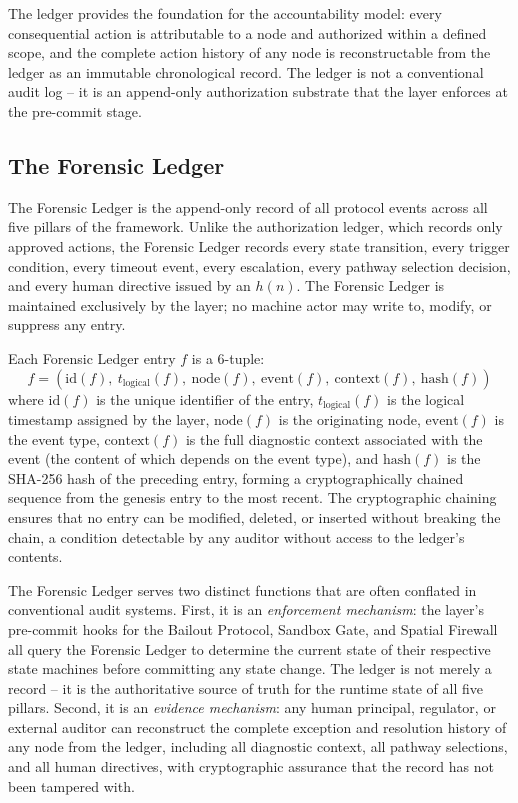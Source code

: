 The ledger provides the foundation for the \bxthree{} accountability model:
every consequential action is attributable to a node and authorized within a
defined scope, and the complete action history of any node is reconstructable
from the ledger as an immutable chronological record.  The ledger is not a
conventional audit log -- it is an append-only authorization substrate that
the \fact{} layer enforces at the pre-commit stage.

\subsection{The Forensic Ledger}\label{sec:forensic-ledger}

The Forensic Ledger is the append-only record of all protocol events across
all five pillars of the framework.  Unlike the authorization ledger, which
records only approved actions, the Forensic Ledger records every state
transition, every trigger condition, every timeout event, every escalation,
every pathway selection decision, and every human directive issued by an
$h(n)$.  The Forensic Ledger is maintained exclusively by the \fact{} layer;
no machine actor may write to, modify, or suppress any entry.

Each Forensic Ledger entry $f$ is a 6-tuple:
\[
f = (\text{id}(f),\ t_{\text{logical}}(f),\ \text{node}(f),\ \text{event}(f),\ \text{context}(f),\ \text{hash}(f))
\]
where $\text{id}(f)$ is the unique identifier of the entry, $t_{\text{logical}}(f)$
is the logical timestamp assigned by the \fact{} layer, $\text{node}(f)$ is the
originating node, $\text{event}(f)$ is the event type, $\text{context}(f)$ is the
full diagnostic context associated with the event (the content of which depends
on the event type), and $\text{hash}(f)$ is the SHA-256 hash of the preceding
entry, forming a cryptographically chained sequence from the genesis entry to
the most recent.  The cryptographic chaining ensures that no entry can be
modified, deleted, or inserted without breaking the chain, a condition detectable
by any auditor without access to the ledger's contents.

The Forensic Ledger serves two distinct functions that are often conflated in
conventional audit systems.  First, it is an \textit{enforcement mechanism}: the
\fact{} layer's pre-commit hooks for the Bailout Protocol, Sandbox Gate, and
Spatial Firewall all query the Forensic Ledger to determine the current state
of their respective state machines before committing any state change.  The
ledger is not merely a record -- it is the authoritative source of truth for
the runtime state of all five pillars.  Second, it is an \textit{evidence
mechanism}: any human principal, regulator, or external auditor can reconstruct
the complete exception and resolution history of any node from the ledger,
including all diagnostic context, all pathway selections, and all human
directives, with cryptographic assurance that the record has not been tampered
with.

